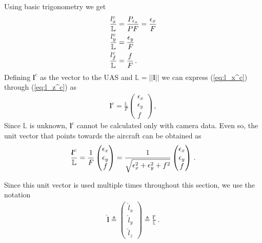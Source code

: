 Using basic trigonometry we get
\begin{align}
\frac{l_x^c}{\mathbb{L}}&=\frac{P_{\epsilon_x}}{PF}=\frac{\epsilon_x}{F}{\label{eq:l_x^c}}\\
\frac{l_y^c}{\mathbb{L}}&=\frac{\epsilon_y}{F}{\label{eq:l_y^c}} \\
\frac{l_f^c}{\mathbb{L}}&=\frac{f}{F}{\label{eq:l_z^c}}\,.
\end{align}
Defining $\boldsymbol{l}^c$ as the vector to the UAS and $\mathbb{L}=\lvert\lvert \boldsymbol{l}\rvert\rvert$ we can express (\ref{eq:l_x^c}) through (\ref{eq:l_z^c}) as
\begin{align}
\boldsymbol{l}^c=\frac{\mathbb{L}}{F}
\begin{pmatrix}
\epsilon_x \\
\epsilon_y \\
f
\end{pmatrix}\,,
\end{align}
Since $\mathbb{L}$ is unknown, $\boldsymbol{l}^c$ cannot be calculated only with camera data. Even so, the unit vector that points towards the aircraft can be obtained as
\begin{align}{\label{eq:norm_line_of_sight_vector}}
\frac{\boldsymbol{l}^c}{\mathbb{L}}=\frac{1}{F}
\begin{pmatrix}
\epsilon_x \\
\epsilon_y \\
f
\end{pmatrix} =
\frac{1}{\sqrt{\epsilon_x^2+\epsilon_y^2+f^2}}
\begin{pmatrix}
\epsilon_x \\
\epsilon_y \\
f
\end{pmatrix}\,.
\end{align}

Since this unit vector is used multiple times throughout this section, we use the notation
\begin{align*}
\check{\boldsymbol{l}}\triangleq
\begin{pmatrix}
\check{l}_x \\
\check{l}_y \\
\check{l}_z
\end{pmatrix} \triangleq
\frac{\boldsymbol{l}^c}{\mathbb{L}}\,.
\end{align*}
\pagebreak
